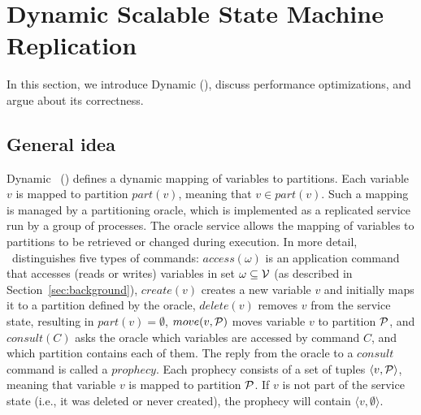 \section{Dynamic Scalable State Machine Replication}

In this section, we introduce Dynamic \ssmr{} (\dssmr), discuss performance optimizations, and argue about its correctness.

\subsection{General idea}
\label{sec:generalidea}

%

Dynamic \ssmr\ (\dssmr) defines a dynamic mapping of variables to partitions.
Each variable $v$ is mapped to partition $part(v)$, meaning that $v \in part(v)$.
Such a mapping is managed by a partitioning oracle, which is implemented as a replicated service run by a group of processes.
The oracle service allows the mapping of variables to partitions to be retrieved or changed during execution.
In more detail, \dssmr\ distinguishes five types of commands:
$access(\omega)$ is an application command that accesses (reads or writes) variables in set $\omega \subseteq \mathcal{V}$ (as described in Section~\ref{sec:background}),
$create(v)$ creates a new variable $v$ and initially maps it to a partition defined by the oracle,
$delete(v)$ removes $v$ from the service state, resulting in $part(v) = \emptyset$,
$move(v,\mathcal{P})$ moves variable $v$ to partition $\mathcal{P}$,
and $consult(C)$ asks the oracle which variables are accessed by command $C$, and which partition contains each of them.
The reply from the oracle to a $consult$ command is called a $prophecy$.
Each prophecy consists of a set of tuples $\langle v, \mathcal{P} \rangle$, meaning that variable $v$ is mapped to partition $\mathcal{P}$.
If $v$ is not part of the service state (i.e., it was deleted or never created), the prophecy will contain $\langle v, \emptyset \rangle$.

